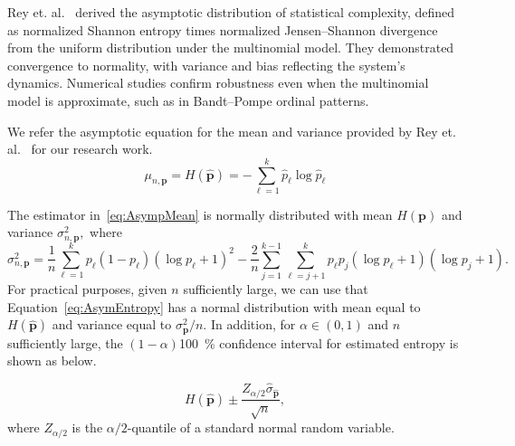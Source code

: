 Rey et. al.~\cite{Rey2025} derived the asymptotic distribution of statistical complexity, defined as normalized Shannon entropy times normalized Jensen–Shannon divergence from the uniform distribution under the multinomial model. They demonstrated convergence to normality, with variance and bias reflecting the system’s dynamics. Numerical studies confirm robustness even when the multinomial model is approximate, such as in Bandt–Pompe ordinal patterns. 

We refer the asymptotic equation for the mean and variance provided by Rey et. al.~\cite{Rey2025} for our research work.
\begin{equation}
	\mu_{n,\mathbf{p}}	= H(\widehat{\mathbf{p}})
	= -\sum_{\ell=1}^k \widehat{p}_\ell \log \widehat{p}_\ell 
	\label{eq:AsympMean}
\end{equation}  

The estimator in~\eqref{eq:AsympMean} is normally distributed with mean $H(\mathbf{p})$ and variance $\sigma^2_{n,\mathbf{p}},$ where
\begin{equation}
	\sigma^2_{n,\mathbf{p}}=\dfrac{1}{n}\sum_{\ell=1}^{k}p_\ell(1-p_\ell)(\log p_\ell+1)^2-\dfrac{2}{n}\sum_{j=1}^{k-1}\sum_{\ell=j+1}^{k}p_\ell p_j(\log p_\ell+1)(\log p_j+1).
\end{equation}
For practical purposes, given $n$ sufficiently large, we can use that 
Equation~\ref{eq:AsymEntropy} has a normal distribution with mean equal to $H(\widehat{\mathbf{p}})$ and variance equal to $\sigma^2_{\mathbf{p}}/n.$ In addition, for $\alpha \in (0,1)$ and $n$ sufficiently large, the $(1-\alpha)$\SI {100}{\percent} confidence interval for estimated entropy is shown as below.

\begin{equation}
	H(\widehat{\mathbf{p}})\pm \dfrac{Z_{\alpha/2}\widehat{\sigma}_{\widehat{\mathbf{p}}}}{\sqrt{n}},
	\label{eq:ConfidenceInterval}
\end{equation}
where $Z_{\alpha/2}$ is the $\alpha/2$-quantile of a standard normal random variable.


